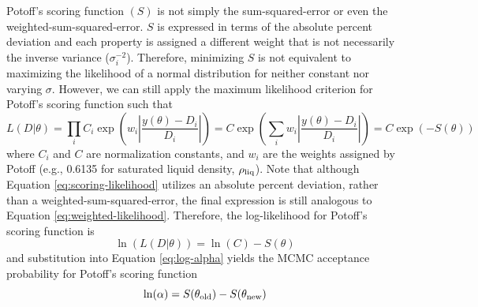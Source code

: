 \documentclass[preprint,review,11pt]{elsarticle}
\begin{document}
	Potoff's scoring function $(S)$ is not simply the sum-squared-error or even the weighted-sum-squared-error. $S$ is expressed in terms of the absolute percent deviation and each property is assigned a different weight that is not necessarily the inverse variance ($\sigma_i^{-2}$). Therefore, minimizing $S$ is not equivalent to maximizing the likelihood of a normal distribution for neither constant nor varying $\sigma$. However, we can still apply the maximum likelihood criterion for Potoff's scoring function such that
	\begin{equation} \label{eq:scoring-likelihood}
	L(D|\theta) = \prod_i C_i \exp\left(w_i\left|\frac{y(\theta)-D_i}{D_i}\right|\right) = C \exp\left(\sum_i w_i\left|\frac{y(\theta)-D_i}{D_i}\right|\right) = C \exp\left(-S(\theta)\right)
	\end{equation}
	where $C_i$ and $C$ are normalization constants, and $w_i$ are the weights assigned by Potoff (e.g., 0.6135 for saturated liquid density, $\rho_{\rm liq}$). Note that although Equation \ref{eq:scoring-likelihood} utilizes an absolute percent deviation, rather than a weighted-sum-squared-error, the final expression is still analogous to Equation \ref{eq:weighted-likelihood}. Therefore, the log-likelihood for Potoff's scoring function is
	\begin{equation}
	\ln(L(D|\theta)) = \ln(C) -S(\theta)
	\end{equation}
	and substitution into Equation \ref{eq:log-alpha} yields the MCMC acceptance probability for Potoff's scoring function
	\begin{equation} \label{eq:log-score}
	\ln(\alpha) = S(\theta_{\rm old}) - S(\theta_{\rm new})
	\end{equation}
	
\end{document}
